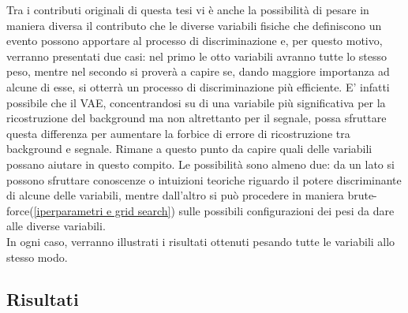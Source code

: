 Tra i contributi originali di questa tesi vi è anche la possibilità di pesare in maniera diversa il contributo che le diverse variabili fisiche che definiscono un evento possono apportare al processo di discriminazione e, per questo motivo, verranno presentati due casi: nel primo le otto variabili avranno tutte lo stesso peso, mentre nel secondo si proverà a capire se, dando maggiore importanza ad alcune di esse, si otterrà un processo di discriminazione più efficiente. E' infatti possibile che il VAE, concentrandosi su di una variabile più significativa per la ricostruzione del background ma non altrettanto per il segnale, possa sfruttare questa differenza per aumentare la forbice di errore di ricostruzione tra background e segnale. Rimane a questo punto da capire quali delle variabili possano aiutare in questo compito. Le possibilità sono almeno due: da un lato si possono sfruttare conoscenze o intuizioni teoriche riguardo il potere discriminante di alcune delle variabili, mentre dall'altro si può procedere in maniera brute-force(\ref{iperparametri e grid search}) sulle possibili configurazioni dei pesi da dare alle diverse variabili.\\
In ogni caso, verranno illustrati i risultati ottenuti pesando tutte le variabili allo stesso modo. \\

\newpage

\subsection{Risultati}
\label{risultati}

